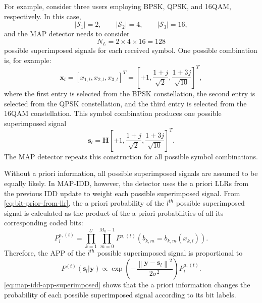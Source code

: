 For example, consider three users employing BPSK, QPSK, and 16QAM, respectively. In this case,
\[
    |\mathcal{S}_1|=2,\qquad
    |\mathcal{S}_2|=4,\qquad
    |\mathcal{S}_3|=16,
\]
and the MAP detector needs to consider
\[
    N_L=2\times 4\times 16=128
\]
possible superimposed signals for each received symbol. One possible combination is, for example:
\begin{equation}
    \bm{x}_{l}
    =
    \left[
    x_{1,l},
    x_{2,l},
    x_{3,l}
    \right]^T
    =
    \left[
    +1,
    \frac{1+j}{\sqrt{2}},
    \frac{1+3j}{\sqrt{10}}
    \right]^T ,
\end{equation}
where the first entry is selected from the BPSK constellation, the second entry is selected from the QPSK constellation, and the third entry is selected from the 16QAM constellation. This symbol combination produces one possible superimposed signal
\begin{equation}
    \bm{s}_{l}
    =
    \bm{H}
    \left[
    +1,
    \frac{1+j}{\sqrt{2}},
    \frac{1+3j}{\sqrt{10}}
    \right]^T .
\end{equation}
The MAP detector repeats this construction for all possible symbol combinations.

Without a priori information, all possible superimposed signals are assumed to be equally likely. In MAP-IDD, however, the detector uses the a priori LLRs from the previous IDD update to weight each possible superimposed signal. From \eqref{eq:bit-prior-from-llr}, the a priori probability of the $l^{th}$ possible superimposed signal is calculated as the product of the a priori probabilities of all its corresponding coded bits:
\begin{equation}
    P^{a,(t)}_{l}
    =
    \prod_{k=1}^{U}
    \prod_{m=0}^{M_k-1}
    P^{a,(t)}
    \left(
    b_{k,m}
    =
    b_{k,m}(x_{k,l})
    \right).
    \label{eq:map-idd-prior-superimposed}
\end{equation}
Therefore, the APP of the $l^{th}$ possible superimposed signal is proportional to
\begin{equation}
    P^{(t)}(\bm{s}_{l}|\bm{y})
    \propto
    \exp\left(
    -\frac{
    \left\|
    \bm{y}
    -
    \bm{s}_{l}
    \right\|^2}
    {2\sigma^2}
    \right)
    P^{a,(t)}_{l}.
    \label{eq:map-idd-app-superimposed}
\end{equation}
\eqref{eq:map-idd-app-superimposed} shows that the a priori information changes the probability of each possible superimposed signal according to its bit labels. 

